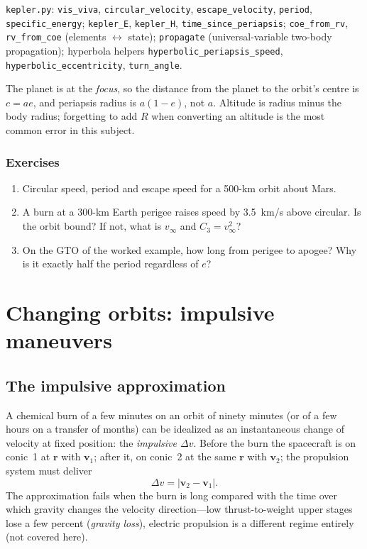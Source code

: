 \documentclass[11pt,letterpaper,oneside]{report}
\newcommand{\dv}{\Delta v}
\newcommand{\vinf}{v_\infty}
\newcommand{\code}[1]{\texttt{#1}}
\newcommand{\bv}[1]{\bm{#1}}
\begin{document}
\begin{codebox}
\code{kepler.py}: \code{vis\_viva}, \code{circular\_velocity}, \code{escape\_velocity},
\code{period}, \code{specific\_energy}; \code{kepler\_E}, \code{kepler\_H},
\code{time\_since\_periapsis}; \code{coe\_from\_rv}, \code{rv\_from\_coe} (elements $\leftrightarrow$ state);
\code{propagate} (universal-variable two-body propagation); hyperbola helpers
\code{hyperbolic\_periapsis\_speed}, \code{hyperbolic\_eccentricity}, \code{turn\_angle}.
\end{codebox}

\begin{pitfall}
The planet is at the \emph{focus}, so the distance from the planet to the orbit's centre is
$c=ae$, and periapsis radius is $a(1-e)$, not $a$. Altitude is radius minus the body radius;
forgetting to add $R$ when converting an altitude is the most common error in this subject.
\end{pitfall}

\subsection*{Exercises}
\begin{enumerate}[label=1.\arabic*,nosep]
\item Circular speed, period and escape speed for a 500-km orbit about Mars.
\item A burn at a 300-km Earth perigee raises speed by \SI{3.5}{km/s} above circular. Is the
      orbit bound? If not, what is $\vinf$ and $C_3=\vinf^2$?
\item On the GTO of the worked example, how long from perigee to apogee? Why is it exactly half the period regardless of $e$?
\end{enumerate}

\chapter{Changing orbits: impulsive maneuvers}\label{ch:maneuvers}

\section{The impulsive approximation}
A chemical burn of a few minutes on an orbit of ninety minutes (or of a few hours on a transfer of
months) can be idealized as an instantaneous change of velocity at fixed position: the
\emph{impulsive $\dv$}. Before the burn the spacecraft is on conic~1 at $\bv r$ with $\bv v_1$;
after it, on conic~2 at the same $\bv r$ with $\bv v_2$; the propulsion system must deliver
\begin{equation}
  \dv=|\bv v_2-\bv v_1| .
\end{equation}
The approximation fails when the burn is long compared with the time over which gravity
changes the velocity direction---low thrust-to-weight upper stages lose a few percent
(\emph{gravity loss}), electric propulsion is a different regime entirely (not covered here).
\end{document}
